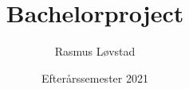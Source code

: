 \documentclass[12pt,a4paper,oneside,draft]{article}
\begin{document}
\title{Bachelorproject}
\author{Rasmus Løvstad}
\date{Efterårssemester 2021}
\maketitle

\tableofcontents








\printbibliography
\end{document}
